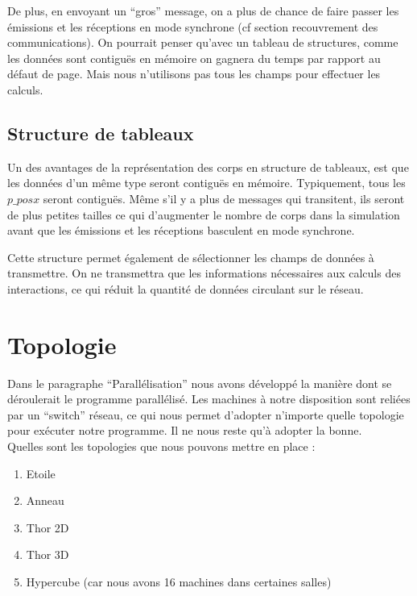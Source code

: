 \par De plus, en envoyant un ``gros'' message, on a plus de chance de faire passer les émissions
et les réceptions en mode synchrone (cf section recouvrement des communications). 
On pourrait penser qu'avec un tableau de structures, comme les données sont contiguës
en mémoire on gagnera du temps par rapport au défaut de page. Mais nous n'utilisons pas tous
 les champs pour effectuer les calculs.

\subsection{Structure de tableaux }

\par Un des avantages de la représentation des corps en structure de tableaux, est 
que les données d'un même type seront contiguës en mémoire. Typiquement, tous les
 $p\_posx$ seront contiguës. Même s'il y a plus de messages qui transitent, ils
seront de plus petites tailles ce qui d'augmenter le nombre de corps dans la simulation
avant que les émissions et les réceptions basculent en mode synchrone.\\

\par Cette structure permet également de sélectionner les champs de données à transmettre.  
On ne transmettra que les informations nécessaires aux calculs des interactions, ce qui réduit 
la quantité de données circulant sur le réseau.


\section{Topologie}

\par Dans le paragraphe ``Parallélisation'' nous avons développé la manière dont se déroulerait 
le programme parallélisé. Les machines à notre disposition sont reliées par un ``switch'' 
réseau, ce qui nous permet d'adopter n'importe quelle topologie pour exécuter notre 
programme. Il ne nous reste qu'à adopter la bonne.\\
Quelles sont les topologies que nous pouvons mettre en place :
\begin{enumerate}
\item[\textbullet] Etoile
\item[\textbullet] Anneau
\item[\textbullet] Thor 2D
\item[\textbullet] Thor 3D
\item[\textbullet] Hypercube (car nous avons 16 machines dans certaines salles)
\end{enumerate}

